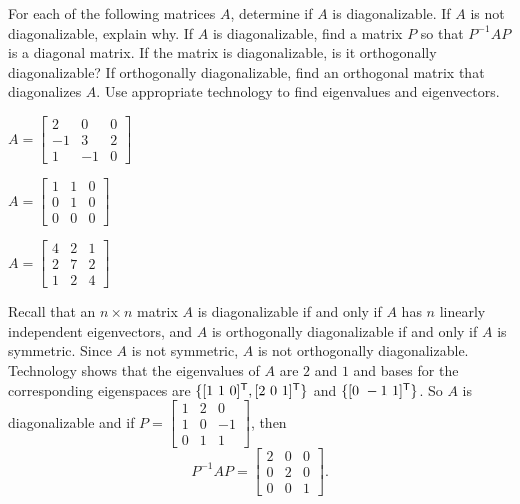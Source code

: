 
\ExampleIntro

\begin{example} For each of the following matrices $A$, determine if $A$ is diagonalizable. If $A$ is not diagonalizable, explain why. If $A$ is diagonalizable, find a matrix $P$ so that $P^{-1}AP$ is a diagonal matrix. If the matrix is diagonalizable, is it orthogonally diagonalizable? If orthogonally diagonalizable, find an orthogonal matrix that diagonalizes $A$. Use appropriate technology to find eigenvalues and eigenvectors. 
	\ba
	\begin{minipage}{1.75in}
	\item $A = \left[ \begin{array}{rrc}  2  &  0  &  0 \\  -1  &  3  &  2 \\  1  & -1  &  0  \end{array} \right]$
	\end{minipage}
	\begin{minipage}{1.5in}
	\item $A = \left[ \begin{array}{ccc}   1  &  1  &  0 \\  0  &  1  &  0 \\  0  &  0  &  0 \end{array} \right]$
	\end{minipage}
	\begin{minipage}{1.5in}
	\item $A = \left[ \begin{array}{ccc}   4  &  2  &  1 \\  2  &  7  &  2 \\  1  &  2  &  4 \end{array} \right]$
	\end{minipage}

	\ea


\ExampleSolution

	\ba
	\item  Recall that an $n \times n$ matrix $A$ is diagonalizable if and only if $A$ has $n$ linearly independent eigenvectors, and $A$ is orthogonally diagonalizable if and only if $A$ is symmetric. Since $A$ is not symmetric, $A$ is not orthogonally diagonalizable. Technology shows that the eigenvalues of $A$ are $2$ and $1$ and bases for the corresponding eigenspaces are  $\{ [1 \ 1\ 0]^{\mathsf{T}}, [2 \ 0 \ 1]^{\mathsf{T}} \}$ and $\{[0 \ -1 \ 1]^{\mathsf{T}}\}$. So $A$ is diagonalizable and if $P = \left[ \begin{array}{rcr} 1&2&0\\1&0&-1\\0&1&1 \end{array} \right]$, then 
\[P^{-1}AP = \left[ \begin{array}{ccc} 2&0&0\\0&2&0\\0&0&1 \end{array} \right].\]


\end{example}
